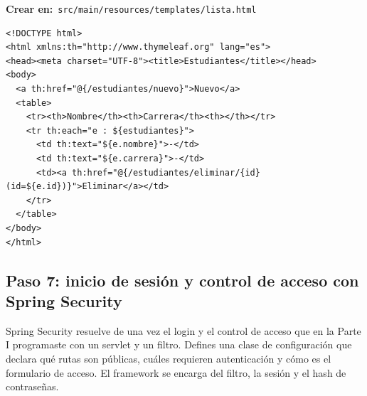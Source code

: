 \documentclass[11pt]{article}
\begin{document}
{\small\color{jwebazulo}\textbf{Crear en:}~}\texttt{src/\allowbreak{}main/\allowbreak{}resources/\allowbreak{}templates/\allowbreak{}lista.\allowbreak{}html}\par\nobreak\vspace{-1pt}
\begin{cajacodigo}
\begin{lstlisting}[style=markup]
<!DOCTYPE html>
<html xmlns:th="http://www.thymeleaf.org" lang="es">
<head><meta charset="UTF-8"><title>Estudiantes</title></head>
<body>
  <a th:href="@{/estudiantes/nuevo}">Nuevo</a>
  <table>
    <tr><th>Nombre</th><th>Carrera</th><th></th></tr>
    <tr th:each="e : ${estudiantes}">
      <td th:text="${e.nombre}">-</td>
      <td th:text="${e.carrera}">-</td>
      <td><a th:href="@{/estudiantes/eliminar/{id}(id=${e.id})}">Eliminar</a></td>
    </tr>
  </table>
</body>
</html>
\end{lstlisting}
\end{cajacodigo}
\vspace{2pt}
\subsection{Paso 7: inicio de sesión y control de acceso con Spring Security}
Spring Security resuelve de una vez el login y el control de acceso que en la Parte I programaste con un servlet y un filtro. Defines una clase de configuración que declara qué rutas son públicas, cuáles requieren autenticación y cómo es el formulario de acceso. El framework se encarga del filtro, la sesión y el hash de contraseñas.
\end{document}
